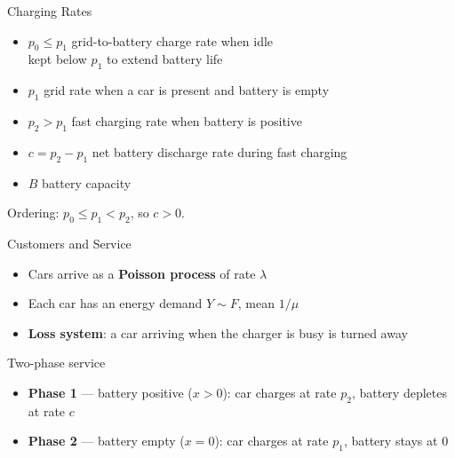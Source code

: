 \documentclass[aspectratio=169]{beamer}
\begin{document}
\begin{frame}{Charging Rates}

  \begin{itemize}
    \setlength\itemsep{1em}
    \item $p_0 \leq p_1$ \quad grid-to-battery charge rate when idle\\
          {\small kept below $p_1$ to extend battery life}
    \item $p_1$ \quad grid rate when a car is present and battery is empty
    \item $p_2 > p_1$ \quad fast charging rate when battery is positive
    \item $c = p_2 - p_1$ \quad net battery discharge rate during fast charging
    \item $B$ \quad battery capacity
  \end{itemize}

  \medskip
  \begin{block}{}
    Ordering: $p_0 \leq p_1 < p_2$, so $c > 0$.
  \end{block}

\end{frame}

\begin{frame}{Customers and Service}

  \begin{itemize}
    \setlength\itemsep{1em}
    \item Cars arrive as a \textbf{Poisson process} of rate $\lambda$
    \item Each car has an energy demand $Y \sim F$, mean $1/\mu$
    \item \textbf{Loss system}: a car arriving when the charger is busy is turned away
  \end{itemize}

  \bigskip
  \begin{block}{Two-phase service}
    \begin{itemize}
      \setlength\itemsep{0.5em}
      \item \textbf{Phase 1} --- battery positive ($x>0$): car charges at rate $p_2$, battery depletes at rate $c$
      \item \textbf{Phase 2} --- battery empty ($x=0$): car charges at rate $p_1$, battery stays at $0$
    \end{itemize}
  \end{block}

\end{frame}
\end{document}

